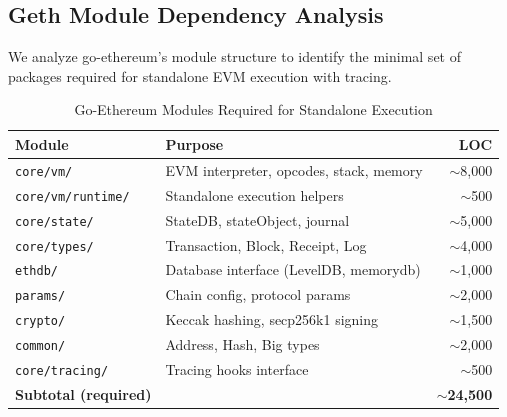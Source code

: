 \subsection{Geth Module Dependency Analysis}

We analyze go-ethereum's module structure to identify the minimal set of
packages required for standalone EVM execution with tracing.

\begin{table}[htbp]
\caption{Go-Ethereum Modules Required for Standalone Execution}
\label{tab:geth-modules}
\centering
\begin{tabular}{llr}
\toprule
\textbf{Module} & \textbf{Purpose} & \textbf{LOC} \\
\midrule
\texttt{core/vm/} & EVM interpreter, opcodes, stack, memory & ${\sim}$8{,}000 \\
\texttt{core/vm/runtime/} & Standalone execution helpers & ${\sim}$500 \\
\texttt{core/state/} & StateDB, stateObject, journal & ${\sim}$5{,}000 \\
\texttt{core/types/} & Transaction, Block, Receipt, Log & ${\sim}$4{,}000 \\
\texttt{ethdb/} & Database interface (LevelDB, memorydb) & ${\sim}$1{,}000 \\
\texttt{params/} & Chain config, protocol params & ${\sim}$2{,}000 \\
\texttt{crypto/} & Keccak hashing, secp256k1 signing & ${\sim}$1{,}500 \\
\texttt{common/} & Address, Hash, Big types & ${\sim}$2{,}000 \\
\texttt{core/tracing/} & Tracing hooks interface & ${\sim}$500 \\
\midrule
\textbf{Subtotal (required)} & & ${\sim}$\textbf{24{,}500} \\
\bottomrule
\end{tabular}
\end{table}

